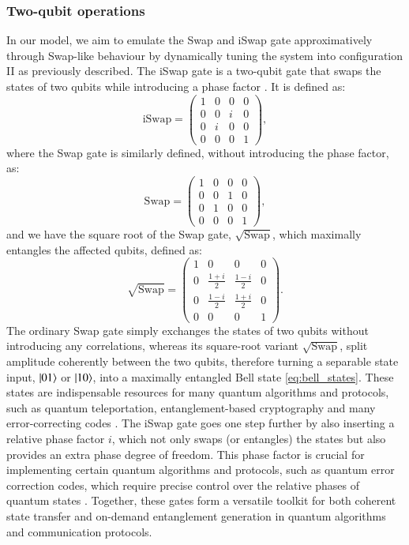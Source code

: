 \documentclass{subfiles}
\begin{document}
\subsubsection*{Two-qubit operations}
In our model, we aim to emulate the Swap and iSwap gate approximatively through Swap-like behaviour by dynamically tuning the system into configuration II as previously described. The iSwap gate is a two-qubit gate that swaps the states of two qubits while introducing a phase factor \cite{nielsen2010quantum}. It is defined as:
\begin{equation}
    \text{iSwap} = \begin{pmatrix}
    1 & 0 & 0 & 0 \\
    0 & 0 & i & 0 \\
    0 & i & 0 & 0 \\
    0 & 0 & 0 & 1
    \end{pmatrix} \label{eq:iswap_gate},
\end{equation}
where the Swap gate is similarly defined, without introducing the phase factor, as:
\begin{equation}
    \text{Swap} = \begin{pmatrix}
    1 & 0 & 0 & 0 \\
    0 & 0 & 1 & 0 \\
    0 & 1 & 0 & 0 \\
    0 & 0 & 0 & 1
    \end{pmatrix} \label{eq:swap_gate},
\end{equation}
and we have the square root of the Swap gate, $\sqrt{\text{Swap}}$, which maximally entangles the affected qubits, defined as:
\begin{equation}
    \sqrt{\text{Swap}} = \begin{pmatrix}
    1 & 0 & 0 & 0 \\
    0 & \frac{1+i}{2} & \frac{1-i}{2} & 0 \\
    0 & \frac{1-i}{2} & \frac{1+i}{2} & 0 \\
    0 & 0 & 0 & 1
    \end{pmatrix} \label{eq:sqrt_swap_gate}.
\end{equation}
The ordinary Swap gate simply exchanges the states of two qubits without introducing any correlations, whereas its square-root variant $\sqrt{\text{Swap}}$, split amplitude coherently between the two qubits, therefore turning a separable state input, $\ket{01}$ or $\ket{10}$, into a maximally entangled Bell state \eqref{eq:bell_states}. These states are indispensable resources for many quantum algorithms and protocols, such as quantum teleportation, entanglement-based cryptography and many error-correcting codes \cite{nielsen2010quantum, bouwmeester1997experimental, yin2020entanglement}. The iSwap gate goes one step further by also inserting a relative phase factor $i$, which not only swaps (or entangles) the states but also provides an extra phase degree of freedom. This phase factor is crucial for implementing certain quantum algorithms and protocols, such as quantum error correction codes, which require precise control over the relative phases of quantum states \cite{tanamoto2008efficient, shor1996fault}. Together, these gates form a versatile toolkit for both coherent state transfer and on-demand entanglement generation in quantum algorithms and communication protocols. 
\end{document}

